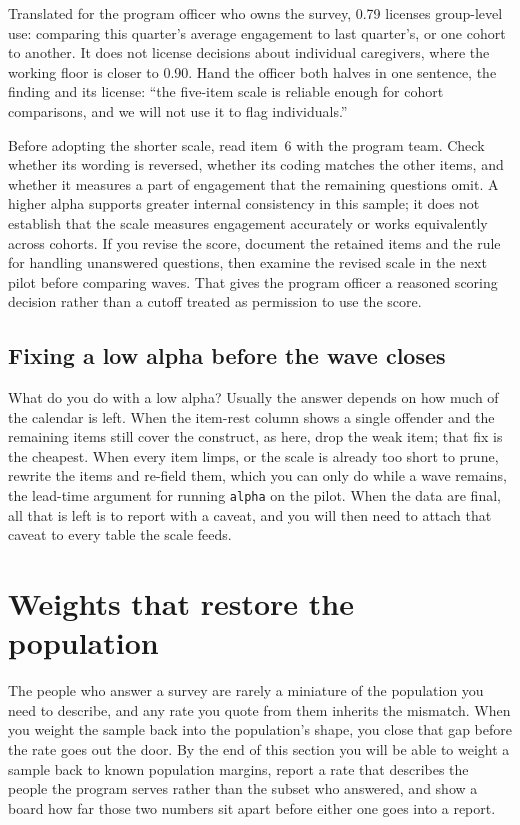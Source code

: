 Translated for the program officer who owns the survey, 0.79 licenses group-level use: comparing this quarter's average engagement to last quarter's, or one cohort to another. It does not license decisions about individual caregivers, where the working floor is closer to 0.90. Hand the officer both halves in one sentence, the finding and its license: \enquote{the five-item scale is reliable enough for cohort comparisons, and we will not use it to flag individuals.}

Before adopting the shorter scale, read item~6 with the program team. Check whether its wording is reversed, whether its coding matches the other items, and whether it measures a part of engagement that the remaining questions omit. A higher alpha supports greater internal consistency in this sample; it does not establish that the scale measures engagement accurately or works equivalently across cohorts. If you revise the score, document the retained items and the rule for handling unanswered questions, then examine the revised scale in the next pilot before comparing waves. That gives the program officer a reasoned scoring decision rather than a cutoff treated as permission to use the score.

\subsection{Fixing a low alpha before the wave closes}\label{sec:alpha-fix}
What do you do with a low alpha? Usually the answer depends on how much of the calendar is left. When the item-rest column shows a single offender and the remaining items still cover the construct, as here, drop the weak item; that fix is the cheapest. When every item limps, or the scale is already too short to prune, rewrite the items and re-field them, which you can only do while a wave remains, the lead-time argument for running \texttt{alpha} on the pilot. When the data are final, all that is left is to report with a caveat, and you will then need to attach that caveat to every table the scale feeds.

\section{Weights that restore the population}\label{sec:weights}
The people who answer a survey are rarely a miniature of the population you need to describe, and any rate you quote from them inherits the mismatch. When you weight the sample back into the population's shape, you close that gap before the rate goes out the door. By the end of this section you will be able to weight a sample back to known population margins, report a rate that describes the people the program serves rather than the subset who answered, and show a board how far those two numbers sit apart before either one goes into a report.

